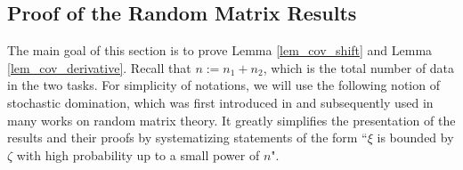 \subsection{Proof of the Random Matrix Results}\label{appendix RMT}

The main goal of this section is to prove Lemma \ref{lem_cov_shift} and Lemma \ref{lem_cov_derivative}. Recall that $n:=n_1+n_2$, which is the total number of data in the two tasks. 
%
For simplicity of notations, we will use the following notion of stochastic domination, which was first introduced in \cite{Average_fluc} and subsequently used in many works on random matrix theory. It greatly simplifies the presentation of the results and their proofs by systematizing statements of the form ``$\xi$ is bounded by $\zeta$ with high probability up to a small power of $n$".

